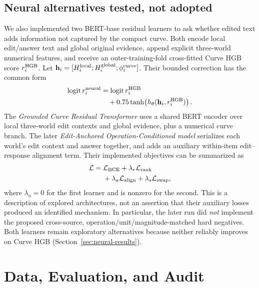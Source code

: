 \documentclass[11pt]{article}
\begin{document}
\subsection{Neural alternatives tested, not adopted}
We also implemented two BERT-base \citep{devlin-etal-2019-bert} residual learners to ask whether edited text adds information not captured by the compact curve. Both encode local edit/answer text and global original evidence, append explicit three-world numerical features, and receive an outer-training-fold cross-fitted Curve HGB score $r_i^{\rm HGB}$. Let $\mathbf h_i=[H_i^{\rm local};H_i^{\rm global};\phi_i^{\rm curve}]$. Their bounded correction has the common form
\begin{equation}
\begin{aligned}
\operatorname{logit} r_i^{\rm neural}
&=\operatorname{logit} r_i^{\rm HGB}\\
&\quad +0.75\tanh\!\left(h_\theta(\mathbf h_i,r_i^{\rm HGB})\right).
\end{aligned}
\label{eq:residual}
\end{equation}
The \emph{Grounded Curve Residual Transformer} uses a shared BERT encoder over local three-world edit contexts and global evidence, plus a numerical curve branch. The later \emph{Edit-Anchored Operation-Conditioned model} serializes each world's edit context and answer together, and adds an auxiliary within-item edit--response alignment term. Their implemented objectives can be summarized as
\begin{equation}
\begin{aligned}
\mathcal{L}={}&\mathcal{L}_{\rm BCE}
+\lambda_r\mathcal{L}_{\rm rank}\\
&+\lambda_a\mathcal{L}_{\rm align}
+\lambda_s\mathcal{L}_{\rm swap},
\end{aligned}
\label{eq:loss}
\end{equation}
where $\lambda_a=0$ for the first learner and is nonzero for the second. This is a description of explored architectures, not an assertion that their auxiliary losses produced an identified mechanism. In particular, the later run did \emph{not} implement the proposed cross-source, operation/unit/magnitude-matched hard negatives. Both learners remain exploratory alternatives because neither reliably improves on Curve HGB (Section~\ref{sec:neural-results}).

\section{Data, Evaluation, and Audit}
\end{document}
